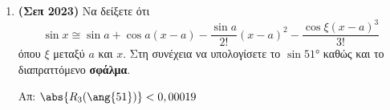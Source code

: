 \documentclass[a4paper,table]{report}
\begin{document}
\begin{enumerate}
  \item{\bfseries (Σεπ 2023)} Να δείξετε ότι 
    \[
      \sin{x} \cong \sin{a} + \cos{a} (x-a) - \frac{\sin{a}}{2!} (x-a)^{2} -
      \frac{\cos{\xi} (x-a)^{3}}{3!}
    \]
    όπου $\xi$ μεταξύ $a$ και $x$. Στη συνέχεια να υπολογίσετε το $
    \sin{\ang{51}}$ καθώς και το διαπραττόμενο \textbf{σφάλμα}.

    \hfill Απ: $ \abs{R_{3}(\ang{51})} < 0,00019 $


\end{enumerate}
\end{document}
